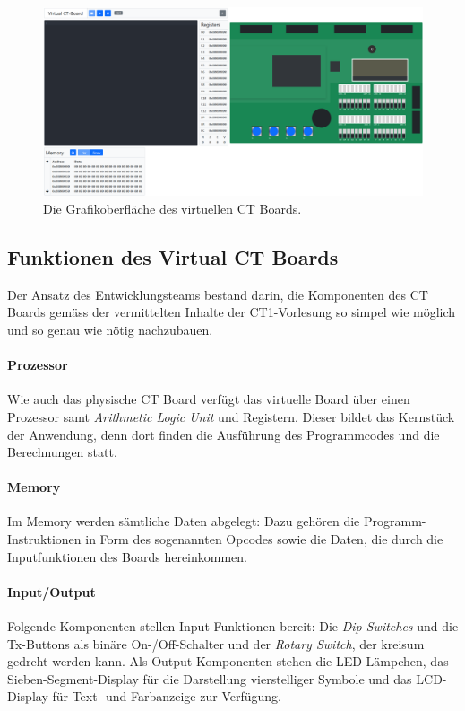 \documentclass[10pt]{article}
\begin{document}
\begin{figure}[h]
\includegraphics[width=\textwidth]{final}
\caption[size=8pt]{Die Grafikoberfläche des virtuellen CT Boards.}
\label{final}
\end{figure}

\subsection{Funktionen des \glqq Virtual CT Boards\grqq}

Der Ansatz des Entwicklungsteams bestand darin, die Komponenten des CT Boards gemäss der vermittelten Inhalte der CT1-Vorlesung so simpel wie möglich und so genau wie nötig nachzubauen.

\paragraph{Prozessor} Wie auch das physische CT Board verfügt das virtuelle Board über einen Prozessor samt \emph{Arithmetic Logic Unit} und Registern. Dieser bildet das Kernstück der Anwendung, denn dort finden die Ausführung des Programmcodes und die Berechnungen statt. 

\paragraph{Memory} Im Memory werden sämtliche Daten abgelegt: Dazu gehören die Programm-Instruktionen in Form des sogenannten Opcodes sowie die Daten, die durch die Inputfunktionen des Boards hereinkommen.

\paragraph{Input/Output} Folgende Komponenten stellen Input-Funktionen bereit: Die \emph{Dip Switches} und die Tx-Buttons als binäre On-/Off-Schalter und der \emph{Rotary Switch}, der kreisum gedreht werden kann. Als Output-Komponenten stehen die LED-Lämpchen, das Sieben-Segment-Display für die Darstellung vierstelliger Symbole und das LCD-Display für Text- und Farbanzeige zur Verfügung.
\end{document}
